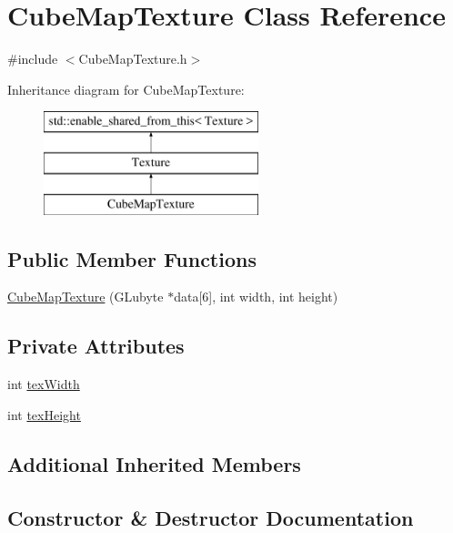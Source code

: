 \hypertarget{class_cube_map_texture}{}\section{Cube\+Map\+Texture Class Reference}
\label{class_cube_map_texture}


{\ttfamily \#include $<$Cube\+Map\+Texture.\+h$>$}

Inheritance diagram for Cube\+Map\+Texture\+:\begin{figure}[H]
\begin{center}
\leavevmode
\includegraphics[height=3.000000cm]{class_cube_map_texture}
\end{center}
\end{figure}
\subsection*{Public Member Functions}
\begin{DoxyCompactItemize}
\item
\hyperlink{class_cube_map_texture_adf0b01d1180ddc452ed1cf02bf5f7687}{Cube\+Map\+Texture} (G\+Lubyte $\ast$data\mbox{[}6\mbox{]}, int width, int height)
\end{DoxyCompactItemize}
\subsection*{Private Attributes}
\begin{DoxyCompactItemize}
\item
int \hyperlink{class_cube_map_texture_a7890234be6ca631a5f17a9ab9d7e597c}{tex\+Width}
\item
int \hyperlink{class_cube_map_texture_ad7cb6fe0f1405749dac36016772b4de9}{tex\+Height}
\end{DoxyCompactItemize}
\subsection*{Additional Inherited Members}


\subsection{Constructor \& Destructor Documentation}
\hypertarget{class_cube_map_texture_adf0b01d1180ddc452ed1cf02bf5f7687}{}\label{class_cube_map_texture_adf0b01d1180ddc452ed1cf02bf5f7687}

